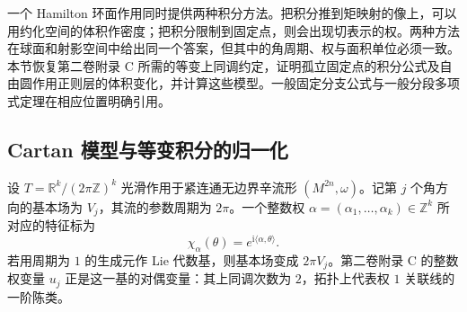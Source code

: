 
% 
% 
% 
% 


一个 Hamilton 环面作用同时提供两种积分方法。把积分推到矩映射的像上，可以用约化空间的体积作密度；把积分限制到固定点，则会出现切表示的权。两种方法在球面和射影空间中给出同一个答案，但其中的角周期、权与面积单位必须一致。本节恢复第二卷附录 C 所需的等变上同调约定，证明孤立固定点的积分公式及自由圆作用正则层的体积变化，并计算这些模型。一般固定分支公式与一般分段多项式定理在相应位置明确引用。

\subsection{Cartan 模型与等变积分的归一化}
\label{g4:subsec:1206:01}
设 \(T=\mathbb R^k/(2\pi\mathbb Z)^k\) 光滑作用于紧连通无边界辛流形 \((M^{2n},\omega)\)。记第 \(j\) 个角方向的基本场为 \(V_j\)，其流的参数周期为 \(2\pi\)。一个整数权 \(\alpha=(\alpha_1,\ldots,\alpha_k)\in\mathbb Z^k\) 所对应的特征标为
\[
	\chi_\alpha(\theta)=e^{\mathrm{i}\langle\alpha,\theta\rangle}.
\]
若用周期为 \(1\) 的生成元作 Lie 代数基，则基本场变成 \(2\pi V_j\)。第二卷附录 C 的整数权变量 \(u_j\) 正是这一基的对偶变量：其上同调次数为 \(2\)，拓扑上代表权 \(1\) 关联线的一阶陈类。

\ProseParagraphBreak

